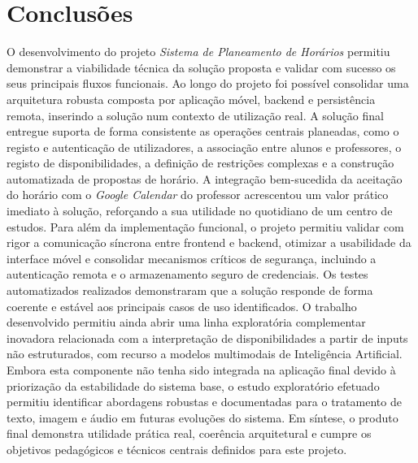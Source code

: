 %
%
\chapter{Conclusões} \label{cap:conclusoes}

O desenvolvimento do projeto \textit{Sistema de Planeamento de Horários} permitiu demonstrar a viabilidade técnica da solução proposta e validar com sucesso os seus principais fluxos funcionais.
Ao longo do projeto foi possível consolidar uma arquitetura robusta composta por aplicação móvel, backend e persistência remota, inserindo a solução num contexto de utilização real.
A solução final entregue suporta de forma consistente as operações centrais planeadas, como o registo e autenticação de utilizadores, a associação entre alunos e professores, o registo de disponibilidades, a definição de restrições complexas e a construção automatizada de propostas de horário.
A integração bem-sucedida da aceitação do horário com o \textit{Google Calendar} do professor acrescentou um valor prático imediato à solução, reforçando a sua utilidade no quotidiano de um centro de estudos.
Para além da implementação funcional, o projeto permitiu validar com rigor a comunicação síncrona entre frontend e backend, otimizar a usabilidade da interface móvel e consolidar mecanismos críticos de segurança, incluindo a autenticação remota e o armazenamento seguro de credenciais.
Os testes automatizados realizados demonstraram que a solução responde de forma coerente e estável aos principais casos de uso identificados.
O trabalho desenvolvido permitiu ainda abrir uma linha exploratória complementar inovadora relacionada com a interpretação de disponibilidades a partir de inputs não estruturados, com recurso a modelos multimodais de Inteligência Artificial.
Embora esta componente não tenha sido integrada na aplicação final devido à priorização da estabilidade do sistema base, o estudo exploratório efetuado permitiu identificar abordagens robustas e documentadas para o tratamento de texto, imagem e áudio em futuras evoluções do sistema.
Em síntese, o produto final demonstra utilidade prática real, coerência arquitetural e cumpre os objetivos pedagógicos e técnicos centrais definidos para este projeto.
